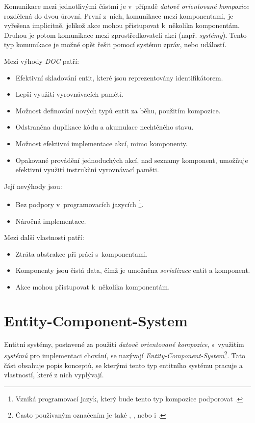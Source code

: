 Komunikace mezi jednotlivými částmi je v~případě \emph{datově orientované kompozice} rozdělená do dvou úrovní. První z~nich, komunikace mezi komponentami, je vyřešena implicitně, jelikož akce mohou přistupovat k~několika komponentám. Druhou je potom komunikace mezi zprostředkovateli akcí (např. \emph{systémy}). Tento typ komunikace je možné opět řešit pomocí systému zpráv, nebo událostí. 

\pagebreak

\noindent Mezi výhody \emph{DOC} patří: 
\begin{itemize}
	\item Efektivní skladování entit, které jsou reprezentovány identifikátorem.
	\item Lepší využití vyrovnávacích pamětí.
	\item Možnost definování nových typů entit za běhu, použitím kompozice.
	\item Odstraněna duplikace kódu a akumulace nechtěného stavu.
	\item Možnost efektivní implementace akcí, mimo komponenty.
	\item Opakované provádění jednoduchých akcí, nad seznamy komponent, umožňuje efektivní využití instrukční vyrovnávací paměti.
\end{itemize}

\noindent Její nevýhody jsou: 
\begin{itemize}
	\item Bez podpory v~programovacích jazycích \footnote{Vzniká programovací jazyk, který bude tento typ kompozice podporovat \cite{OOHLang}.}.
	\item Náročná implementace.
\end{itemize}

\noindent Mezi další vlastnosti patří:
\begin{itemize}
	\item Ztráta abstrakce při práci s~komponentami.
	\item Komponenty jsou čistá data, čímž je umožněna \emph{serializace} entit a komponent.
	\item Akce mohou přistupovat k~několika komponentám.
\end{itemize}

\section{Entity-Component-System}
\label{Chap:EntitySystem} 

Entitní systémy, postavené za použití \emph{datově orientované kompozice}, s~využitím \emph{systémů} pro implementaci chování, se nazývají \emph{Entity-Component-System}\footnote{Často používaným označením je také ,  , nebo i .}. Tato část obsahuje popis konceptů, se kterými tento typ entitního systému pracuje a vlastností, které z nich vyplývají.

